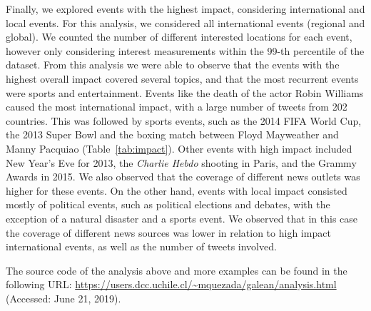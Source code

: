 Finally, we explored events with the highest impact, considering international
and local events.  
%
For this analysis, we considered all international events (regional and global).
%
We counted the number of different interested locations for each event, however
only considering interest measurements within the 99-th percentile of the
dataset.
%
From this analysis we were able to observe that the events with the highest
overall impact covered several topics, and that the most recurrent events were
sports and entertainment.  
%
Events like the death of the actor Robin Williams caused the most international
impact, with a large number of tweets from 202 countries.  
%
This was followed by sports events, such as the 2014 FIFA World Cup, the 2013
Super Bowl and the boxing match between Floyd Mayweather and Manny Pacquiao
(Table~\ref{tab:impact}).
%
Other events with high impact included New Year's Eve for 2013, the
\emph{Charlie Hebdo} shooting in Paris, and the Grammy Awards in 2015.  
%
We also observed that the coverage of different news outlets was higher for
these events.
%
On the other hand, events with local impact consisted mostly of political
events, such as political elections and debates, with the exception of a natural
disaster and a sports event.
%
We observed that in this case the coverage of different news sources was lower
in relation to high impact international events, as well as the number of tweets
involved.


The source code of the analysis above and more examples can be found in the
following URL: \url{https://users.dcc.uchile.cl/~mquezada/galean/analysis.html}
(Accessed: June 21, 2019).